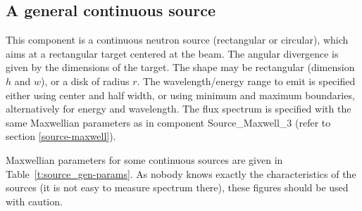 \subsection*{A general continuous source}
\label{source-gen}


This component is a continuous neutron source (rectangular or circular), which aims at
a rectangular target centered at the beam.
The angular divergence is given by the dimensions of the target.
The shape may be rectangular (dimension $h$ and $w$), or a disk of radius $r$.
The wavelength/energy range to emit is specified either using center and half width, or using minimum and maximum boundaries, alternatively for energy and wavelength.
The flux spectrum is specified with the same Maxwellian parameters as in component Source\_Maxwell\_3 (refer to section \ref{source-maxwell}).

Maxwellian parameters for some continuous sources
are given in Table~\ref{t:source_gen-params}. As nobody knows exactly the characteristics of the sources (it is not easy to measure spectrum there), these figures should be used with caution.

